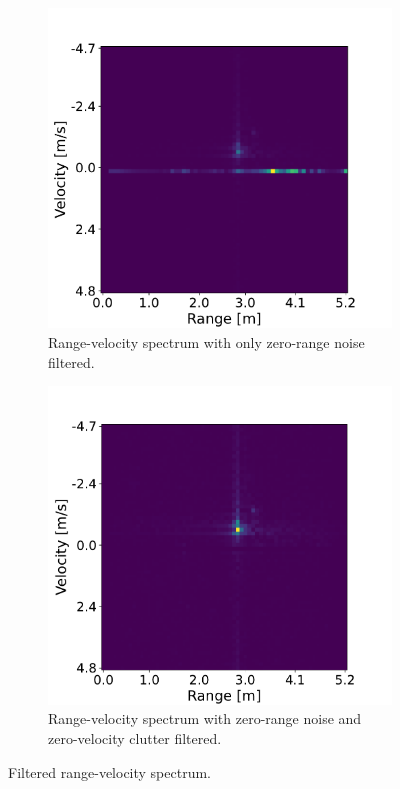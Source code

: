 \begin{figure}[H]
    \centering
    \begin{subfigure}[b]{0.49\textwidth}
        \centering
        \includegraphics[width=\textwidth]{fig/4/range-velocity-range-filtered.pdf}
        \caption{Range-velocity spectrum with only zero-range noise filtered.}
        \label{fig:range-velocity-range-filtered}
    \end{subfigure}
    \hfill
    \begin{subfigure}[b]{0.49\textwidth}
        \centering
        \includegraphics[width=\textwidth]{fig/4/range-velocity-both-filtered.pdf}
        \caption{Range-velocity spectrum with zero-range noise and zero-velocity clutter filtered.}
        \label{fig:range-velocity-both-filtered}
    \end{subfigure}
    \caption{Filtered range-velocity spectrum.}
    \label{fig:range-velocity-spectrum-filtered}
\end{figure}

